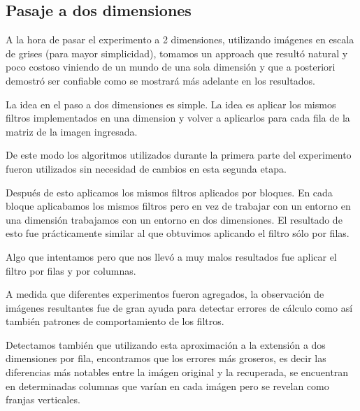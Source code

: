 \subsection{Pasaje a dos dimensiones}

A la hora de pasar el experimento a 2 dimensiones, utilizando im\'agenes en
escala de grises (para mayor simplicidad), tomamos un approach que result\'o
natural y poco costoso viniendo de un mundo de una sola dimensi\'on y que a
posteriori demostr\'o ser confiable como se mostrar\'a m\'as adelante en los
resultados.

La idea en el paso a dos dimensiones es simple. La idea es aplicar los mismos
filtros implementados en una dimension y volver a aplicarlos para cada fila de
la matriz de la imagen ingresada.

De este modo los algoritmos utilizados durante la primera parte del experimento
fueron utilizados sin necesidad de cambios en esta segunda etapa.

Despu\'es de esto aplicamos los mismos filtros aplicados por bloques. En cada bloque
aplicabamos los mismos filtros pero en vez de trabajar con un entorno en una dimensi\'on
trabajamos con un entorno en dos dimensiones. El resultado de esto fue pr\'acticamente similar
al que obtuvimos aplicando el filtro s\'olo por filas.

Algo que intentamos pero que nos llev\'o a muy malos resultados fue aplicar el filtro por filas y por columnas.

A medida que diferentes experimentos fueron agregados, la observaci\'on de
im\'agenes resultantes fue de gran ayuda para detectar errores de c\'alculo como
as\'i tambi\'en patrones de comportamiento de los filtros.

Detectamos tambi\'en que utilizando esta aproximaci\'on a la extensi\'on a dos
dimensiones por fila, encontramos que los errores m\'as groseros, es decir las
diferencias m\'as notables entre la im\'agen original y la recuperada, se
encuentran en determinadas columnas que var\'ian en cada im\'agen pero se
revelan como franjas verticales.
